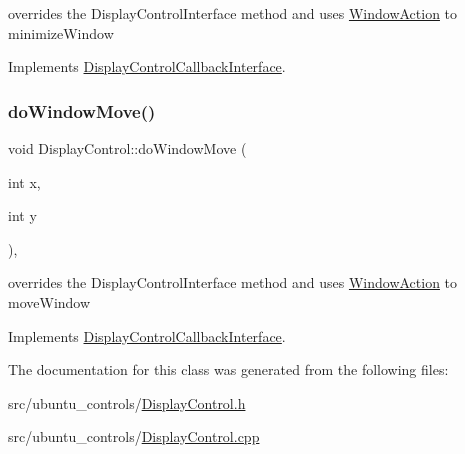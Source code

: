 overrides the Display\+Control\+Interface method and uses \hyperlink{classWindowAction}{Window\+Action} to minimize\+Window 

Implements \hyperlink{classDisplayControlCallbackInterface_a5457bccb953df7296b81b96db827896c}{Display\+Control\+Callback\+Interface}.

\mbox{\label{classDisplayControl_aca4208c53cac28e164e7949effdc04cd}} 
\subsubsection{\texorpdfstring{do\+Window\+Move()}{doWindowMove()}}
{\footnotesize\ttfamily void Display\+Control\+::do\+Window\+Move (\begin{DoxyParamCaption}\item[{int}]{x,  }\item[{int}]{y }\end{DoxyParamCaption})\hspace{0.3cm}{\ttfamily [override]}, {\ttfamily [virtual]}}

overrides the Display\+Control\+Interface method and uses \hyperlink{classWindowAction}{Window\+Action} to move\+Window 

Implements \hyperlink{classDisplayControlCallbackInterface_af8f01d480c76ee88d2719a246b5d4135}{Display\+Control\+Callback\+Interface}.



The documentation for this class was generated from the following files\+:\begin{DoxyCompactItemize}
\item 
src/ubuntu\+\_\+controls/\hyperlink{DisplayControl_8h}{Display\+Control.\+h}\item 
src/ubuntu\+\_\+controls/\hyperlink{DisplayControl_8cpp}{Display\+Control.\+cpp}\end{DoxyCompactItemize}
